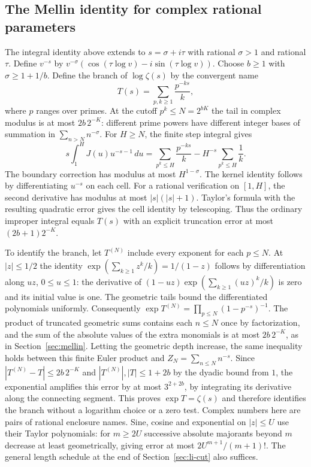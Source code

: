 \subsection{The Mellin identity for complex rational parameters}
The integral identity above extends to $s=\sigma+i\tau$ with rational $\sigma>1$ and rational $\tau$. Define $v^{-s}$ by $v^{-\sigma}(\cos(\tau\log v)-i\sin(\tau\log v))$. Choose $b\ge1$ with $\sigma\ge1+1/b$. Define the branch of $\log\zeta(s)$ by the convergent name
\[
 T(s)=\sum_{p,k\ge1}\frac{p^{-ks}}{k},
\]
where $p$ ranges over primes. At the cutoff $p^k\le N=2^{bK}$ the tail in complex modulus is at most $2b\,2^{-K}$: different prime powers have different integer bases of summation in $\sum_{n>N}n^{-\sigma}$. For $H\ge N$, the finite step integral gives
\[
 s\int_1^H J(u)u^{-s-1}\,du
   =\sum_{p^k\le H}\frac{p^{-ks}}k-H^{-s}\sum_{p^k\le H}\frac1k.
\]
The boundary correction has modulus at most $H^{1-\sigma}$. The kernel identity follows by differentiating $u^{-s}$ on each cell. For a rational verification on $[1,H]$, the second derivative has modulus at most $|s|(|s|+1)$. Taylor's formula with the resulting quadratic error gives the cell identity by telescoping. Thus the ordinary improper integral equals $T(s)$ with an explicit truncation error at most $(2b+1)2^{-K}$.

To identify the branch, let $T^{(N)}$ include every exponent for each $p\le N$. At $|z|\le1/2$ the identity $\exp(\sum_{k\ge1}z^k/k)=1/(1-z)$ follows by differentiation along $uz$, $0\le u\le1$: the derivative of $(1-uz)\exp(\sum_{k\ge1}(uz)^k/k)$ is zero and its initial value is one. The geometric tails bound the differentiated polynomials uniformly. Consequently $\exp T^{(N)}=\prod_{p\le N}(1-p^{-s})^{-1}$. The product of truncated geometric sums contains each $n\le N$ once by factorization, and the sum of the absolute values of the extra monomials is at most $2b\,2^{-K}$, as in Section~\ref{sec:mellin}. Letting the geometric depth increase, the same inequality holds between this finite Euler product and $Z_N=\sum_{n\le N}n^{-s}$. Since $|T^{(N)}-T|\le2b\,2^{-K}$ and $|T^{(N)}|,|T|\le1+2b$ by the dyadic bound from $1$, the exponential amplifies this error by at most $3^{2+2b}$, by integrating its derivative along the connecting segment. This proves $\exp T=\zeta(s)$ and therefore identifies the branch without a logarithm choice or a zero test. Complex numbers here are pairs of rational enclosure names. Sine, cosine and exponential on $|z|\le U$ use their Taylor polynomials: for $m\ge2U$ successive absolute majorants beyond $m$ decrease at least geometrically, giving error at most $2U^{m+1}/(m+1)!$. The general length schedule at the end of Section~\ref{sec:li-cut} also suffices.
